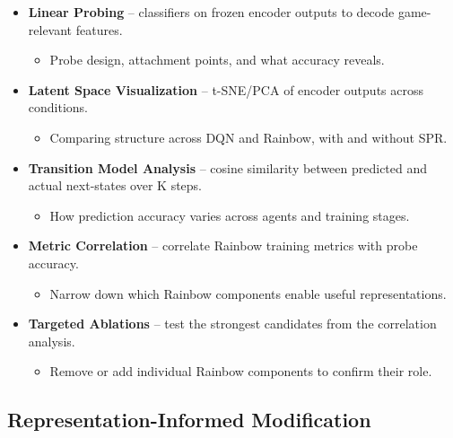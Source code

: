 \documentclass[11pt]{article}
\begin{document}
\begin{itemize}
\item \textbf{Linear Probing} -- classifiers on frozen encoder
  outputs to decode game-relevant features.
  \begin{itemize}[label=$\circ$, itemsep=0.2em, parsep=0pt, topsep=0pt, partopsep=0pt]
  \item Probe design, attachment points, and what accuracy
    reveals.
  \end{itemize}
\item \textbf{Latent Space Visualization} -- t-SNE/PCA of encoder
  outputs across conditions.
  \begin{itemize}[label=$\circ$, itemsep=0.2em, parsep=0pt, topsep=0pt, partopsep=0pt]
  \item Comparing structure across DQN and Rainbow, with and
    without SPR.
  \end{itemize}
\item \textbf{Transition Model Analysis} -- cosine similarity
  between predicted and actual next-states over K steps.
  \begin{itemize}[label=$\circ$, itemsep=0.2em, parsep=0pt, topsep=0pt, partopsep=0pt]
  \item How prediction accuracy varies across agents and training
    stages.
  \end{itemize}
\item \textbf{Metric Correlation} -- correlate Rainbow training
  metrics with probe accuracy.
  \begin{itemize}[label=$\circ$, itemsep=0.2em, parsep=0pt, topsep=0pt, partopsep=0pt]
  \item Narrow down which Rainbow components enable useful
    representations.
  \end{itemize}
\item \textbf{Targeted Ablations} -- test the strongest candidates
  from the correlation analysis.
  \begin{itemize}[label=$\circ$, itemsep=0.2em, parsep=0pt, topsep=0pt, partopsep=0pt]
  \item Remove or add individual Rainbow components to confirm
    their role.
  \end{itemize}
\end{itemize}

\subsection{Representation-Informed Modification}
\end{document}
